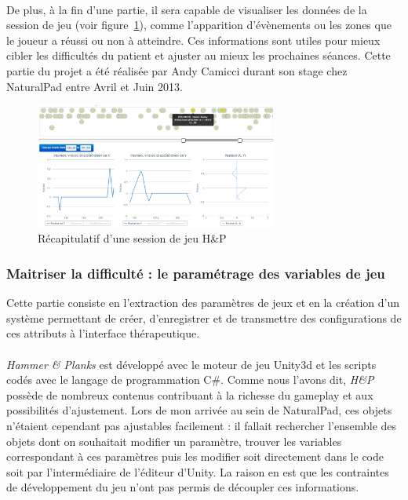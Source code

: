 \paragraph{} De plus, à la fin d'une partie, il sera capable de visualiser les données de la session de jeu (voir figure~\ref{interface_recap}), comme l'apparition d'évènements ou les zones que le joueur a réussi ou non à atteindre. Ces informations sont utiles pour mieux cibler les difficultés du patient et ajuster au mieux les prochaines séances. Cette partie du projet a été réalisée par Andy Camicci durant son stage chez NaturalPad entre Avril et Juin 2013.
\begin{figure}[!hbtp]
	\centering
		\includegraphics[width=8cm]{images/interface_recap.png}
		\caption{Récapitulatif d'une session de jeu H\&P}
		\label{interface_recap}
\end{figure}


	\subsubsection*{Maitriser la difficulté : le paramétrage des variables de jeu}
Cette partie consiste en l'extraction des paramètres de jeux et en la création d'un système permettant de créer, d'enregistrer et de transmettre des configurations de ces attributs à l'interface thérapeutique.

\paragraph{}
\emph{Hammer \& Planks} est développé avec le moteur de jeu Unity3d et les scripts codés avec le langage de programmation C\#. Comme nous l'avons dit, \emph{H\&P} possède de nombreux contenus contribuant à la richesse du gameplay et aux possibilités d'ajustement. Lors de mon arrivée au sein de NaturalPad, ces objets n'étaient cependant pas ajustables facilement : il fallait rechercher l'ensemble des objets dont on souhaitait modifier un paramètre, trouver les variables correspondant à ces paramètres puis les modifier soit directement dans le code soit par l'intermédiaire de l'éditeur d'Unity. La raison en est que les contraintes de développement du jeu n'ont pas permis de découpler ces informations.

